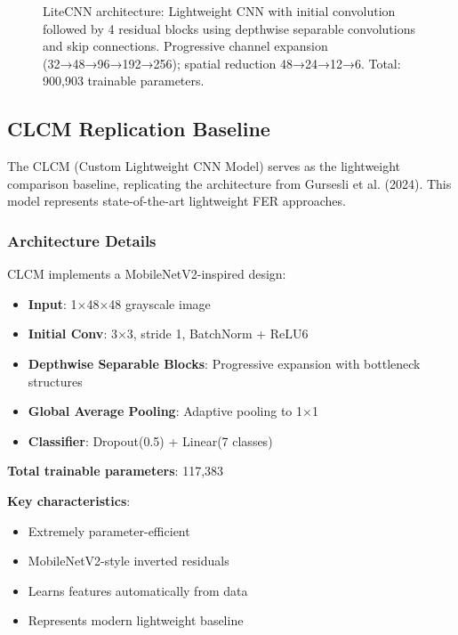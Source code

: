 \documentclass[12pt,a4paper]{article}
\begin{document}
\begin{figure}[h!]
{}
    \caption{LiteCNN architecture: Lightweight CNN with initial convolution followed by 4 residual blocks using depthwise separable convolutions and skip connections. Progressive channel expansion (32→48→96→192→256); spatial reduction 48→24→12→6. Total: 900,903 trainable parameters.}
    \label{fig:litecnn_arch}
\end{figure}

\subsection{CLCM Replication Baseline}
The CLCM (Custom Lightweight CNN Model) serves as the lightweight comparison baseline, replicating the architecture from Gursesli et al. (2024). This model represents state-of-the-art lightweight FER approaches.

\subsubsection{Architecture Details}
CLCM implements a MobileNetV2-inspired design:
\begin{itemize}[leftmargin=*]
    \item \textbf{Input}: 1×48×48 grayscale image  
    \item \textbf{Initial Conv}: 3×3, stride 1, BatchNorm + ReLU6
    \item \textbf{Depthwise Separable Blocks}: Progressive expansion with bottleneck structures
    \item \textbf{Global Average Pooling}: Adaptive pooling to 1×1
    \item \textbf{Classifier}: Dropout(0.5) + Linear(7 classes)
\end{itemize}

\textbf{Total trainable parameters}: 117,383

\textbf{Key characteristics}:
\begin{itemize}[leftmargin=*]
    \item Extremely parameter-efficient
    \item MobileNetV2-style inverted residuals
    \item Learns features automatically from data
    \item Represents modern lightweight baseline
\end{itemize}
\end{document}
